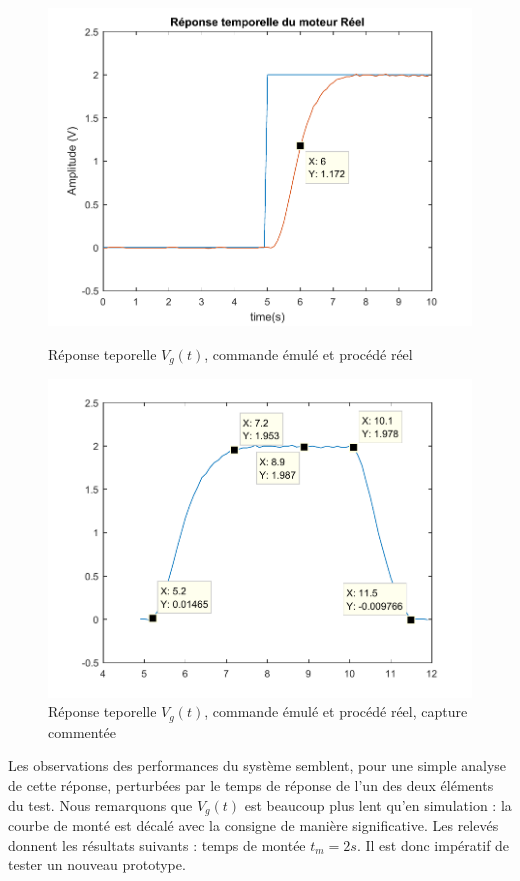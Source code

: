 \begin{figure}[!ht]
\begin{minipage}{.5\textwidth}
\includegraphics[width = \textwidth]{./IV/images/repMoteurReel_proto1.pdf}
		\caption{Réponse teporelle $V_g(t)$, commande émulé et procédé réel\label{fig:rep_MoteurReel_proto1}}		
\end{minipage}
\begin{minipage}{.5\textwidth}
\includegraphics[width = \textwidth]{./IV/images/rep_MoteurReel_proto1.pdf}
		\caption{Réponse teporelle $V_g(t)$, commande émulé et procédé réel, capture commentée \label{fig:rep_MoteurReel_proto1zoom}}
\end{minipage}
\end{figure}				
Les observations des performances du système semblent, pour une simple analyse de cette réponse, perturbées par le temps de réponse de l'un des deux éléments du test. Nous remarquons que $V_g(t)$ est beaucoup plus lent qu'en simulation : la courbe de monté est décalé avec la consigne de manière significative. Les relevés donnent les résultats suivants : temps de montée $t_m = 2s$. Il est donc impératif de tester un nouveau prototype. 

